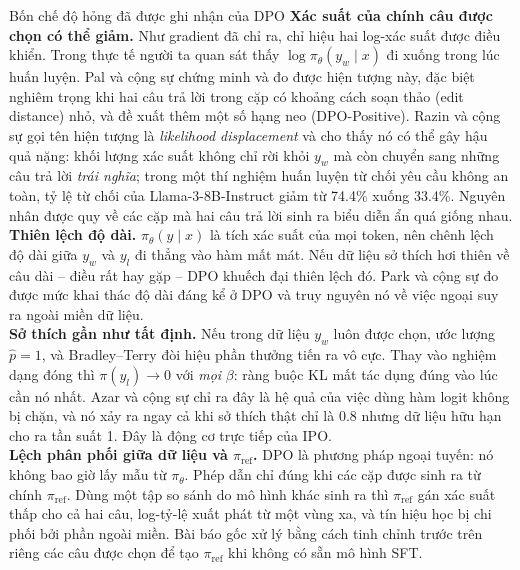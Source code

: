 \begin{pitfall}{Bốn chế độ hỏng đã được ghi nhận của DPO}
\textbf{Xác suất của chính câu được chọn có thể giảm.} Như gradient đã chỉ ra, chỉ hiệu hai log-xác suất được điều khiển. Trong thực tế người ta quan sát thấy \( \log\pi_{\theta}(y_w \mid x) \) đi xuống trong lúc huấn luyện. Pal và cộng sự \cite{pal2024smaug} chứng minh và đo được hiện tượng này, đặc biệt nghiêm trọng khi hai câu trả lời trong cặp có khoảng cách soạn thảo (edit distance) nhỏ, và đề xuất thêm một số hạng neo (DPO-Positive). Razin và cộng sự \cite{razin2025displacement} gọi tên hiện tượng là \emph{likelihood displacement} và cho thấy nó có thể gây hậu quả nặng: khối lượng xác suất không chỉ rời khỏi \( y_w \) mà còn chuyển sang những câu trả lời \emph{trái nghĩa}; trong một thí nghiệm huấn luyện từ chối yêu cầu không an toàn, tỷ lệ từ chối của Llama-3-8B-Instruct giảm từ 74.4\% xuống 33.4\%. Nguyên nhân được quy về các cặp mà hai câu trả lời sinh ra biểu diễn ẩn quá giống nhau.\\[4pt]
\textbf{Thiên lệch độ dài.} \( \pi_{\theta}(y \mid x) \) là tích xác suất của mọi token, nên chênh lệch độ dài giữa \( y_w \) và \( y_l \) đi thẳng vào hàm mất mát. Nếu dữ liệu sở thích hơi thiên về câu dài -- điều rất hay gặp -- DPO khuếch đại thiên lệch đó. Park và cộng sự \cite{park2024length} đo được mức khai thác độ dài đáng kể ở DPO và truy nguyên nó về việc ngoại suy ra ngoài miền dữ liệu.\\[4pt]
\textbf{Sở thích gần như tất định.} Nếu trong dữ liệu \( y_w \) luôn được chọn, ước lượng \( \hat{p} = 1 \), và Bradley--Terry đòi hiệu phần thưởng tiến ra vô cực. Thay vào nghiệm dạng đóng thì \( \pi(y_l) \to 0 \) với \emph{mọi} \( \beta \): ràng buộc KL mất tác dụng đúng vào lúc cần nó nhất. Azar và cộng sự \cite{azar2024ipo} chỉ ra đây là hệ quả của việc dùng hàm logit không bị chặn, và nó xảy ra ngay cả khi sở thích thật chỉ là 0.8 nhưng dữ liệu hữu hạn cho ra tần suất 1. Đây là động cơ trực tiếp của IPO.\\[4pt]
\textbf{Lệch phân phối giữa dữ liệu và \( \pi_{\text{ref}} \).} DPO là phương pháp ngoại tuyến: nó không bao giờ lấy mẫu từ \( \pi_{\theta} \). Phép dẫn chỉ đúng khi các cặp được sinh ra từ chính \( \pi_{\text{ref}} \). Dùng một tập so sánh do mô hình khác sinh ra thì \( \pi_{\text{ref}} \) gán xác suất thấp cho cả hai câu, log-tỷ-lệ xuất phát từ một vùng xa, và tín hiệu học bị chi phối bởi phần ngoài miền. Bài báo gốc xử lý bằng cách tinh chỉnh trước trên riêng các câu được chọn để tạo \( \pi_{\text{ref}} \) khi không có sẵn mô hình SFT.
\end{pitfall}

